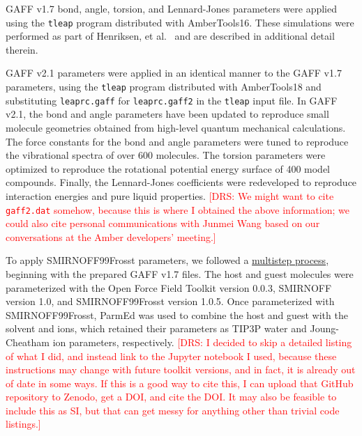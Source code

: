 \documentclass[9pt,lineno]{elife}
\newcommand{\drsnote}[1]{ {\textcolor{red} { [DRS: #1] }}}
\newcommand{\drsnote}[1]{}
\begin{document}
GAFF v1.7 bond, angle, torsion, and Lennard-Jones parameters were applied using the \texttt{tleap} program distributed with AmberTools16. These simulations were performed as part of Henriksen, et al.~\cite{henriksen_evaluating_2017} and are described in additional detail therein.

GAFF v2.1 parameters were applied in an identical manner to the GAFF v1.7 parameters, using the \texttt{tleap} program distributed with AmberTools18 and substituting \texttt{leaprc.gaff} for \texttt{leaprc.gaff2} in the \texttt{tleap} input file.
In GAFF v2.1, the bond and angle parameters have been updated to reproduce small molecule geometries obtained from high-level quantum mechanical calculations.
The force constants for the bond and angle parameters were tuned to reproduce the vibrational spectra of over 600 molecules.
The torsion parameters were optimized to reproduce the rotational potential energy surface of 400 model compounds.
Finally, the Lennard-Jones coefficients were redeveloped to reproduce interaction energies and pure liquid properties.
\drsnote{We might want to cite \texttt{gaff2.dat} somehow, because this is where I obtained the above information; we could also cite personal communications with Junmei Wang based on our conversations at the Amber developers' meeting.}

To apply SMIRNOFF99Frosst parameters, we followed a \href{https://github.com/slochower/smirnoff-host-guest/blob/master/02-convert-APR-files.ipynb}{multistep process}, beginning with the prepared GAFF v1.7 files.
The host and guest molecules were parameterized with the Open Force Field Toolkit version 0.0.3, SMIRNOFF version 1.0, and SMIRNOFF99Frosst version 1.0.5.
Once parameterized with SMIRNOFF99Frosst, ParmEd \cite{shirts_lessons_2017} was used to combine the host and guest with the solvent and ions, which retained their parameters as TIP3P water and Joung-Cheatham ion parameters, respectively.
\drsnote{I decided to skip a detailed listing of what I did, and instead link to the Jupyter notebook I used, because these instructions may change with future toolkit versions, and in fact, it is already out of date in some ways. If this is a good way to cite this, I can upload that GitHub repository to Zenodo, get a DOI, and cite the DOI. It may also be feasible to include this as SI, but that can get messy for anything other than trivial code listings.}
\end{document}
